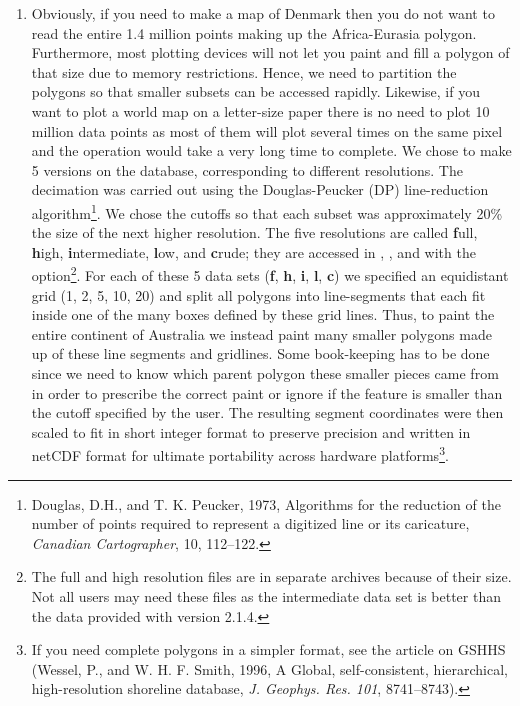 \begin{enumerate}
\item Obviously, if you need to make a map of Denmark then
you do not want to read the entire 1.4 million points making
up the Africa-Eurasia polygon.  Furthermore, most plotting
devices will not let you paint and fill a polygon of that size
due to memory restrictions.  Hence, we need to partition the
polygons so that smaller subsets can be accessed rapidly.
Likewise, if you want to plot a world map on a letter-size paper
there is no need to plot 10 million data points as most of them
will plot several times on the same pixel and the operation
would take a very long time to complete.  We chose to make 5
versions on the database, corresponding to different resolutions.
The decimation was carried out using the Douglas-Peucker (DP)
line-reduction algorithm\footnote{Douglas, D.H., and T. K. Peucker,
1973, Algorithms for the reduction of the number of points
required to represent a digitized line or its caricature,
{\it Canadian Cartographer}, 10, 112--122.}.  We chose the
cutoffs so that each subset was approximately 20\% the size of
the next higher resolution.  The five resolutions are called
{\bf f}ull, {\bf h}igh, {\bf i}ntermediate, {\bf l}ow, and
{\bf c}rude; they are accessed in , ,
and  with the  option\footnote{ The full
and high resolution files are in separate archives because of their
size.  Not all users may need these files as the intermediate data
set is better than the data provided with version 2.1.4.}.  For each of
these 5 data sets ({\bf f}, {\bf h}, {\bf i}, {\bf l}, {\bf c})
we specified an equidistant grid (1\DS, 2\DS, 5\DS,
10\DS, 20\DS) and split all polygons into line-segments
that each fit inside one of the many boxes defined by these grid
lines.  Thus, to paint the entire continent of Australia we
instead paint many smaller polygons made up of these line
segments and gridlines.  Some book-keeping has to be done since
we need to know which parent polygon these smaller pieces came
from in order to prescribe the correct paint or ignore if the
feature is smaller than the cutoff specified by the user.  The
resulting segment coordinates were then scaled to fit in short
integer format to preserve precision and written in netCDF format
for ultimate portability across hardware platforms\footnote{
If you need complete polygons in a simpler format, see the article
on GSHHS (Wessel, P., and W. H. F. Smith, 1996, A Global, self-consistent, hierarchical, high-resolution shoreline database,
{\it J. Geophys. Res. 101}, 8741--8743).}.


\end{enumerate}
